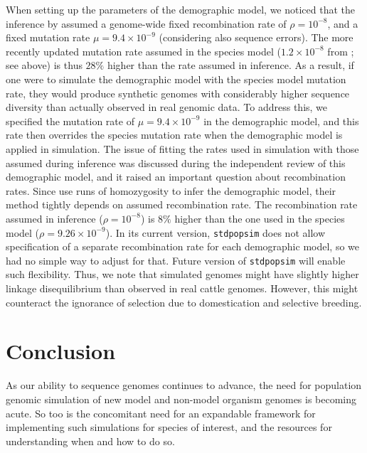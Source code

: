 \documentclass[hidelinks]{article}
\newcommand{\stdpopsim}{\texttt{stdpopsim}\xspace}
\begin{document}
When setting up the parameters of the demographic model, we noticed that the inference by \cite{MacLeod2013} assumed a genome-wide fixed recombination rate of \(\rho=10^{-8}\), and a fixed mutation rate \(\mu=9.4 \times 10^{-9}\) (considering also sequence errors).
%
The more recently updated mutation rate assumed in the species model (\(1.2\times 10^{-8}\) from  \citep{Harland2017}; see above) is thus \(28\%\) higher than the rate assumed in inference.
%
As a result, if one were to simulate the demographic model with the species model mutation rate, they would produce synthetic genomes with considerably higher sequence diversity than actually observed in real genomic data.
%
To address this, we specified the mutation rate of \(\mu=9.4 \times 10^{-9}\) in the demographic model, and this rate then overrides the species mutation rate when the demographic model is applied in simulation.
%
%
The issue of fitting the rates used in simulation with those assumed during inference was discussed during the independent review of this demographic model, and it raised an important question about recombination rates. Since \cite{MacLeod2013} use runs of homozygosity to infer the demographic model, their method tightly depends on assumed recombination rate. The recombination rate assumed in inference (\(\rho=10^{-8}\)) is \(8\%\) higher than the one used in the species model (\(\rho=9.26\times 10^{-9}\)). In its current version, \texttt{\stdpopsim} does not allow specification of a separate recombination rate for each demographic model, so we had no simple way to adjust for that. Future version of \texttt{\stdpopsim} will enable such flexibility. Thus, we note that simulated genomes might have slightly higher linkage disequilibrium than observed in real cattle genomes. However, this might counteract the ignorance of selection due to domestication and selective breeding.

\hypertarget{conclusion}{%
\section*{Conclusion}\label{conclusion}}

As our ability to sequence genomes continues to advance, the need for
population genomic simulation of new model and non-model organism genomes is
becoming acute. So too is the concomitant need for an expandable framework
for implementing such simulations for species of interest, and
the resources for understanding when and how to do so.
\end{document}
